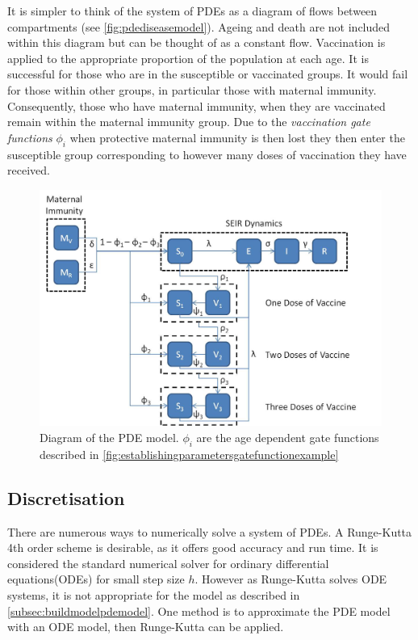 \documentclass[a4paper,11pt] {scrartcl}
\begin{document}
\newpage
\doublespacing
It is simpler to think of the system of PDEs as a diagram of flows between compartments (see \autoref{fig:pdediseasemodel}). Ageing and death are not included within this diagram but can be thought of as a constant flow. Vaccination is applied to the appropriate proportion of the population at each age. It is successful for those who are in the susceptible or vaccinated groups. It would fail for those within other groups, in particular those with maternal immunity. Consequently, those who have maternal immunity, when they are vaccinated remain within the maternal immunity group. Due to the \textit{vaccination gate functions} $\phi_i$ when protective maternal immunity is then lost they then enter the susceptible group corresponding to however many doses of vaccination they have received.
\begin{figure}[h]
\centering
\includegraphics[width=\textwidth]{modelflow.jpg}
\caption{Diagram of the PDE model. $\phi_i$ are the age dependent gate functions described in \autoref{fig:establishingparametersgatefunctionexample}}
\label{fig:pdediseasemodel}
\end{figure}

\subsection{Discretisation}
\label{subsec:buildmodeldiscretisation}
There are numerous ways to numerically solve a system of PDEs. A Runge-Kutta 4th order scheme is desirable, as it offers good accuracy and run time. It is considered the standard numerical solver for ordinary differential equations(ODEs) for small step size $h$. However as Runge-Kutta solves ODE systems, it is not appropriate for the model as described in \autoref{subsec:buildmodelpdemodel}. One method is to approximate the PDE model with an ODE model, then Runge-Kutta can be applied.
\end{document}
